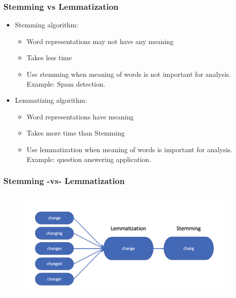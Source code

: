 \documentclass[compress, aspectratio=54]{beamer}
\begin{document}
\begin{frame}
\frametitle{ Stemming vs Lemmatization}
\begin{itemize}
\item Stemming algorithm: 
\begin{itemize}
\item Word representations may not have any
meaning
\item Takes less time
\item Use stemming when meaning of words is
not important for analysis. Example: Spam
detection.

\end{itemize}

\item Lemmatizing algorithm:
\begin{itemize}
\item Word representations have meaning
\item Takes more time than Stemming
\item Use lemmatization when meaning of
words is important for analysis. Example:
question answering application.
\end{itemize}

\end{itemize}
\end{frame}


\begin{frame}
\frametitle{Stemming -vs- Lemmatization}
\begin{figure}

\includegraphics[width=0.8\linewidth ]{Figures/stemming-vs-lemmatization.png}
\end{figure}

\end{frame}


\end{document}
